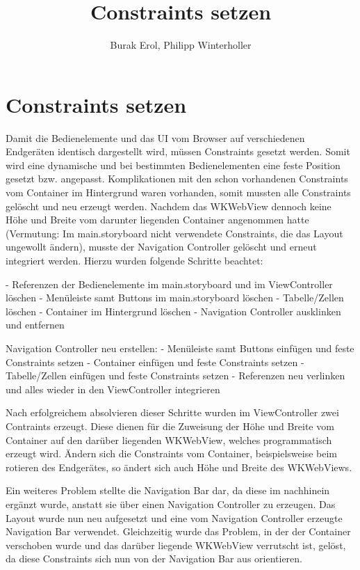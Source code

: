 
\title{Constraints setzen}
\author{Burak Erol, Philipp Winterholler}

\section{Constraints setzen}

Damit die Bedienelemente und das UI vom Browser auf verschiedenen Endgeräten identisch dargestellt wird, müssen Constraints gesetzt werden. Somit wird eine dynamische und bei bestimmten Bedienelementen eine feste Position gesetzt bzw. angepasst. Komplikationen mit den schon vorhandenen Constraints vom Container im Hintergrund waren vorhanden, somit mussten alle Constraints gelöscht und neu erzeugt werden. Nachdem das WKWebView dennoch keine Höhe und Breite vom darunter liegenden Container angenommen hatte (Vermutung: Im main.storyboard nicht verwendete Constraints, die das Layout ungewollt ändern), musste der Navigation Controller gelöscht und erneut integriert werden. Hierzu wurden folgende Schritte beachtet:

- Referenzen der Bedienelemente im main.storyboard und im ViewController löschen 
- Menüleiste samt Buttons im main.storyboard löschen 
- Tabelle/Zellen löschen
- Container im Hintergrund löschen
- Navigation Controller ausklinken und entfernen

Navigation Controller neu erstellen:
- Menüleiste samt Buttons einfügen und feste Constraints setzen
- Container einfügen und feste Constraints setzen
- Tabelle/Zellen einfügen und feste Constraints setzen
- Referenzen neu verlinken und alles wieder in den ViewController integrieren

Nach erfolgreichem absolvieren dieser Schritte wurden im ViewController zwei Contraints erzeugt. Diese dienen für die Zuweisung der Höhe und Breite vom Container auf den darüber liegenden WKWebView, welches programmatisch erzeugt wird. Ändern sich die Constraints vom Container, beispielsweise beim rotieren des Endgerätes, so ändert sich auch Höhe und Breite des WKWebViews.

Ein weiteres Problem stellte die Navigation Bar dar, da diese im nachhinein ergänzt wurde, anstatt sie über einen Navigation Controller zu erzeugen. Das Layout wurde nun neu aufgesetzt und eine vom Navigation Controller erzeugte Navigation Bar verwendet. Gleichzeitig wurde das Problem, in der der Container verschoben wurde und das darüber liegende WKWebView verrutscht ist, gelöst, da diese Constraints sich nun von der Navigation Bar aus orientieren.

